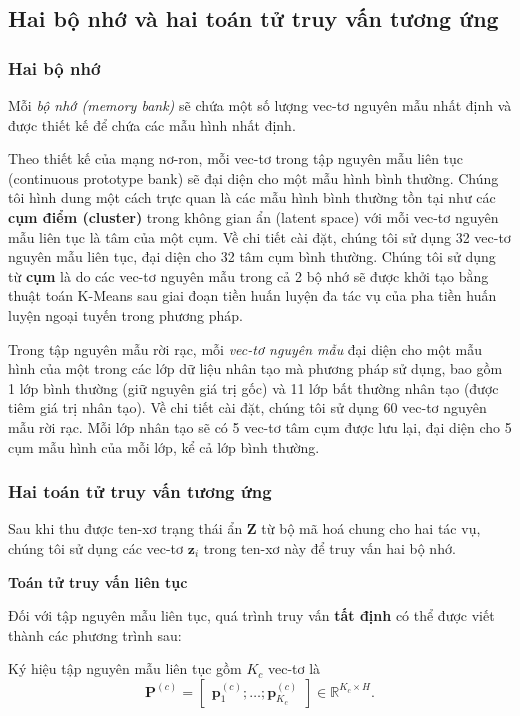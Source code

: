 \pagebreak
\subsection{Hai bộ nhớ và hai toán tử truy vấn tương ứng}
\subsubsection{Hai bộ nhớ}
Mỗi \textit{bộ nhớ (memory bank)} sẽ chứa một số lượng vec-tơ nguyên mẫu nhất định và được thiết kế để chứa các mẫu hình nhất định.

Theo thiết kế của mạng nơ-ron, mỗi vec-tơ trong tập nguyên mẫu liên tục (continuous prototype bank) sẽ đại diện cho một mẫu hình bình thường. Chúng tôi hình dung một cách trực quan là các mẫu hình bình thường tồn tại như các \textbf{cụm điểm (cluster)} trong không gian ẩn (latent space) với mỗi vec-tơ nguyên mẫu liên tục là tâm của một cụm. Về chi tiết cài đặt, chúng tôi sử dụng 32 vec-tơ nguyên mẫu liên tục, đại diện cho 32 tâm cụm bình thường. Chúng tôi sử dụng từ \textbf{cụm} là do các vec-tơ nguyên mẫu trong cả 2 bộ nhớ sẽ được khởi tạo bằng thuật toán K-Means \cite{lloyd1982least} sau giai đoạn tiền huấn luyện đa tác vụ của pha tiền huấn luyện ngoại tuyến trong phương pháp.

Trong tập nguyên mẫu rời rạc, mỗi \textit{vec-tơ nguyên mẫu} đại diện cho một mẫu hình của một trong các lớp dữ liệu nhân tạo mà phương pháp sử dụng, bao gồm 1 lớp bình thường (giữ nguyên giá trị gốc) và 11 lớp bất thường nhân tạo (được tiêm giá trị nhân tạo). Về chi tiết cài đặt, chúng tôi sử dụng 60 vec-tơ nguyên mẫu rời rạc. Mỗi lớp nhân tạo sẽ có 5 vec-tơ tâm cụm được lưu lại, đại diện cho 5 cụm mẫu hình của mỗi lớp, kể cả lớp bình thường.

\subsubsection{Hai toán tử truy vấn tương ứng}

Sau khi thu được ten-xơ trạng thái ẩn \(\mathbf{Z}\) từ bộ mã hoá chung cho hai tác vụ, chúng tôi sử dụng các vec-tơ \(\mathbf{z}_{i}\) trong ten-xơ này để truy vấn hai bộ nhớ.

\textbf{Toán tử truy vấn liên tục}

Đối với tập nguyên mẫu liên tục, quá trình truy vấn \textbf{tất định} có thể được viết thành các phương trình sau:

Ký hiệu tập nguyên mẫu liên tục gồm \(K_c\) vec-tơ là
\begin{equation}
\mathbf{P}^{(c)}
=
\begin{bmatrix}
\mathbf{p}^{(c)}_1;
\ldots;
\mathbf{p}^{(c)}_{K_c}
\end{bmatrix}
\in \mathbb{R}^{K_c\times H}.
\end{equation}

